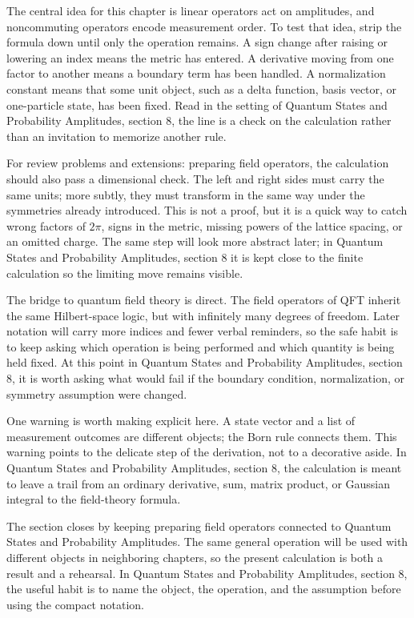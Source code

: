 The central idea for this chapter is linear operators act on amplitudes, and noncommuting operators encode measurement order.  To test that idea, strip the formula down until only the operation remains.  A sign change after raising or lowering an index means the metric has entered.  A derivative moving from one factor to another means a boundary term has been handled.  A normalization constant means that some unit object, such as a delta function, basis vector, or one-particle state, has been fixed.  Read in the setting of Quantum States and Probability Amplitudes, section 8, the line is a check on the calculation rather than an invitation to memorize another rule.

For review problems and extensions: preparing field operators, the calculation should also pass a dimensional check.  The left and right sides must carry the same units; more subtly, they must transform in the same way under the symmetries already introduced.  This is not a proof, but it is a quick way to catch wrong factors of \(2\pi\), signs in the metric, missing powers of the lattice spacing, or an omitted charge.  The same step will look more abstract later; in Quantum States and Probability Amplitudes, section 8 it is kept close to the finite calculation so the limiting move remains visible.

The bridge to quantum field theory is direct.  The field operators of QFT inherit the same Hilbert-space logic, but with infinitely many degrees of freedom.  Later notation will carry more indices and fewer verbal reminders, so the safe habit is to keep asking which operation is being performed and which quantity is being held fixed.  At this point in Quantum States and Probability Amplitudes, section 8, it is worth asking what would fail if the boundary condition, normalization, or symmetry assumption were changed.

One warning is worth making explicit here.  A state vector and a list of measurement outcomes are different objects; the Born rule connects them.  This warning points to the delicate step of the derivation, not to a decorative aside.  In Quantum States and Probability Amplitudes, section 8, the calculation is meant to leave a trail from an ordinary derivative, sum, matrix product, or Gaussian integral to the field-theory formula.

The section closes by keeping preparing field operators connected to Quantum States and Probability Amplitudes.  The same general operation will be used with different objects in neighboring chapters, so the present calculation is both a result and a rehearsal.  In Quantum States and Probability Amplitudes, section 8, the useful habit is to name the object, the operation, and the assumption before using the compact notation.



